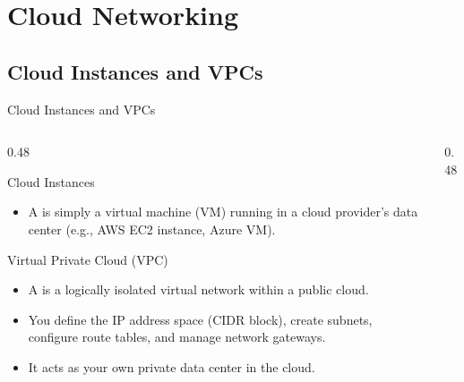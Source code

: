 \documentclass[aspectratio=169]{beamer}  %
\begin{document}
\section{Cloud Networking}
\subsection{Cloud Instances and VPCs}


\begin{frame}[t]{Cloud Instances and VPCs}
    \begin{columns}[T]
        \begin{column}{0.48\textwidth}
            \begin{block}{Cloud Instances}
                \footnotesize
                \begin{itemize}
                    \item A  is simply a virtual machine (VM) running in a cloud provider's data center (e.g., AWS EC2 instance, Azure VM).
                \end{itemize}
            \end{block}
            \vspace{0.2em}
            \begin{block}{Virtual Private Cloud (VPC)}
                \footnotesize
                \begin{itemize}
                    \item A  is a logically isolated virtual network within a public cloud.
                    \item You define the IP address space (CIDR block), create subnets, configure route tables, and manage network gateways.
                    \item It acts as your own private data center in the cloud.
                \end{itemize}
            \end{block}
        \end{column}
        \begin{column}{0.48\textwidth}
            \begin{center}
\end{center}
\end{column}
\end{columns}
\end{frame}
\end{document}
